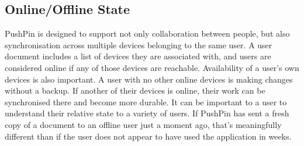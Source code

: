 \subsection{Online/Offline State}

PushPin is designed to support not only collaboration between people, but also synchronisation across multiple devices belonging to the same user. A user document includes a list of devices they are associated with, and users are considered online if any of those devices are reachable. Availability of a user's own devices is also important. A user with no other online devices is making changes without a backup. If another of their devices is online, their work can be synchronised there and become more durable. It can be important to a user to understand their relative state to a variety of users. If PushPin has sent a fresh copy of a document to an offline user just a moment ago, that's meaningfully different than if the user does not appear to have used the application in weeks. 
